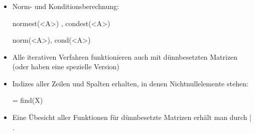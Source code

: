 \documentclass[hyperref={xetex}]{beamer}
\begin{document}
\begin{frame}[fragile]\frametitle{}
\begin{itemize}
\item Norm- und Konditionsberechnung:
\begin{matlabin}
normest(<A>) , condest(<A>)
\end{matlabin}
\begin{pyin}
norm(<A>), cond(<A>)  
\end{pyin}

\item Alle iterativen Verfahren funktionieren auch mit d\"unnbesetzten
  Matrizen (oder haben eine spezielle Version) 
\item Indizes aller Zeilen und Spalten erhalten, in denen Nichtnullelemente stehen: 
\begin{matlabin}
[I,J] = find(X)
\end{matlabin}
\item Eine \"Ubesicht aller Funktionen f\"ur d\"unnbesetzte Matrizen erh\"alt
  man durch \alert{ | }.  
\end{itemize}
\end{frame}
\end{document}
